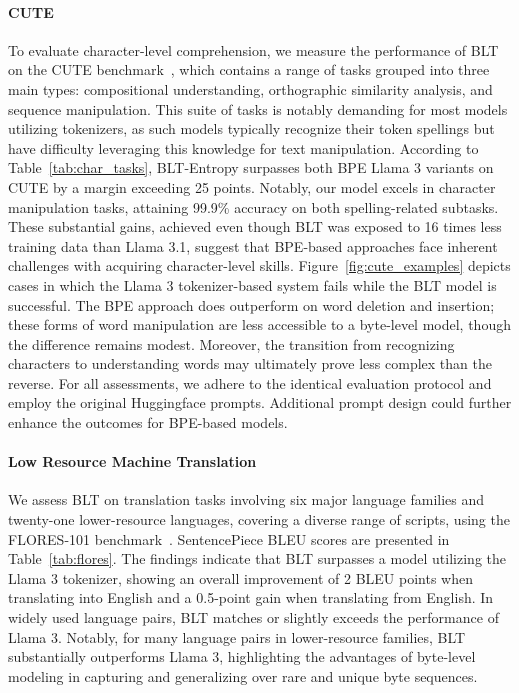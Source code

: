 \paragraph{CUTE}
To evaluate character-level comprehension, we measure the performance of {\textsc BLT} on the CUTE benchmark~\citep{edman2024cute}, which contains a range of tasks grouped into three main types: compositional understanding, orthographic similarity analysis, and sequence manipulation. This suite of tasks is notably demanding for most models utilizing tokenizers, as such models typically recognize their token spellings but have difficulty leveraging this knowledge for text manipulation. According to Table~\ref{tab:char_tasks}, {\textsc BLT}-Entropy surpasses both BPE Llama 3 variants on CUTE by a margin exceeding 25 points. Notably, our model excels in character manipulation tasks, attaining 99.9\% accuracy on both spelling-related subtasks. These substantial gains, achieved even though {\textsc BLT} was exposed to 16 times less training data than Llama 3.1, suggest that BPE-based approaches face inherent challenges with acquiring character-level skills. Figure~\ref{fig:cute_examples} depicts cases in which the Llama 3 tokenizer-based system fails while the {\textsc BLT} model is successful. The BPE approach does outperform on word deletion and insertion; these forms of word manipulation are less accessible to a byte-level model, though the difference remains modest. Moreover, the transition from recognizing characters to understanding words may ultimately prove less complex than the reverse. For all assessments, we adhere to the identical evaluation protocol and employ the original Huggingface prompts. Additional prompt design could further enhance the outcomes for BPE-based models.

\paragraph{Low Resource Machine Translation} We assess {\textsc BLT} on translation tasks involving six major language families and twenty-one lower-resource languages, covering a diverse range of scripts, using the FLORES-101 benchmark~\citep{goyal2022flores}. SentencePiece BLEU scores are presented in Table~\ref{tab:flores}. The findings indicate that {\textsc BLT} surpasses a model utilizing the Llama 3 tokenizer, showing an overall improvement of 2 BLEU points when translating into English and a 0.5-point gain when translating from English. In widely used language pairs, {\textsc BLT} matches or slightly exceeds the performance of Llama 3. Notably, for many language pairs in lower-resource families, {\textsc BLT} substantially outperforms Llama 3, highlighting the advantages of byte-level modeling in capturing and generalizing over rare and unique byte sequences.

